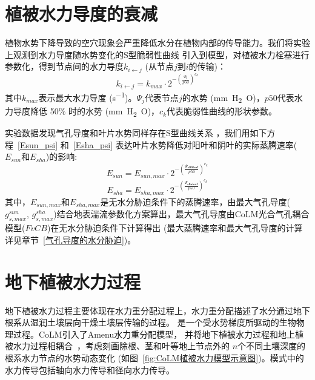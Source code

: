 \section{植被水力导度的衰减}\label{植被水力导度的衰减}
植物水势下降导致的空穴现象会严重降低水分在植物内部的传导能力。我们将实验上观测到水力导度随水势变化的S型脆弱性曲线 
\citep{sperry1988method,gentine2016allometry,neufeld1992genotypic,pammenter1998mathematical,plaut2012hydraulic}
 引入到模型，对植被水力栓塞进行参数化，得到节点间的水力导度$k_{i\gets j}$ (从节点$j$到$i$的传输)：
\begin{equation}
k_{i \leftarrow j}=k_{max} \cdot 2^{-\left(\frac{\Psi_{\mathbf{j}}}{p 50}\right)^{c_{k}}}
\end{equation}
其中$k_{max}$表示最大水力导度 (\unit{s^{-1}})。$\Psi_j$代表节点$j$的水势 (\unit{mm.H_2O})，$p50$代表水力导度降低 50\% 时的水势 (\unit{mm.H_2O})，$c_k$代表脆弱性曲线的形状参数。


实验数据发现气孔导度和叶片水势同样存在S型曲线关系 \citep{kennedy2019implementing,klein2014variability}，我们用如下方程~\eqref{Esun_psi} 和~\eqref{Esha_psi} 表达叶片水势降低对阳叶和阴叶的实际蒸腾速率($E_{sun}$和$E_{sha}$)的影响:
\begin{equation}\label{Esun_psi}
E_{sun}=E_{sun,max} \cdot 2^{-\left(\frac{\Psi_{\mathbf{sunleaf}}}{p 50}\right)^{c_{k}}}
\end{equation}
\begin{equation}\label{Esha_psi}
E_{sha}=E_{sha,max} \cdot 2^{-\left(\frac{\Psi_{\mathbf{shaleaf}}}{p 50}\right)^{c_{k}}}
\end{equation}
其中，$E_{sun,max}$和$E_{sha,max}$是无水分胁迫条件下的蒸腾速率，由最大气孔导度($g_{s,max}^{sun}$, $g_{s,max}^{sha}$)结合地表湍流参数化方案算出，最大气孔导度由CoLM光合气孔耦合模型($FvCB$)在无水分胁迫条件下计算得出 (最大蒸腾速率和最大气孔导度的计算详见章节~\ref{气孔导度的水分胁迫})。


\section{地下植被水力过程}\label{地下植被水力过程}
地下植被水力过程主要体现在水力重分配过程上，水力重分配描述了水分通过地下根系从湿润土壤层向干燥土壤层传输的过程。
是一个受水势梯度所驱动的生物物理过程。CoLM引入了Amenu水力重分配模型\citep{amenu2008,zhu2017incorporating}，
并将地下植被水力过程和地上植被水力过程相耦合~\citep{li2021new}，考虑刻画除根、茎和叶等地上节点外的
$n$个不同土壤深度的根系水力节点的水势动态变化 (如图~\ref{fig:CoLM植被水力模型示意图})。模式中的水力传导包括轴向水力传导和径向水力传导。

